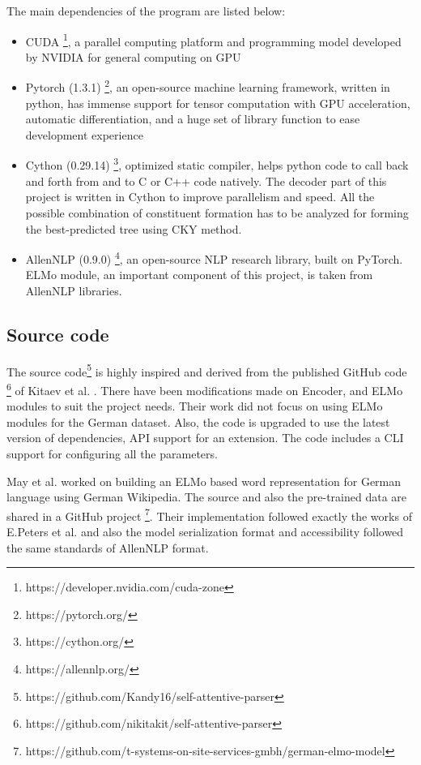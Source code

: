 \documentclass[a4paper, 11pt]{article}
\begin{document}
The main dependencies of the program are listed below:
\begin{itemize}
\item CUDA \footnote{https://developer.nvidia.com/cuda-zone}, a parallel computing platform and programming model developed by NVIDIA for general computing on GPU
\item Pytorch (1.3.1) \footnote{https://pytorch.org/}, an open-source machine learning framework, written in python, has immense support for tensor computation with GPU acceleration, automatic differentiation, and a huge set of library function to ease development experience
\item Cython (0.29.14) \footnote{https://cython.org/}, optimized static compiler, helps python code to call back and forth from and to C or C++ code natively. The decoder part of this project is written in Cython to improve parallelism and speed. All the possible combination of constituent formation has to be analyzed for forming the best-predicted tree using CKY method.
\item AllenNLP (0.9.0) \footnote{https://allennlp.org/}, an open-source NLP research library, built on PyTorch. ELMo module, an important component of this project, is taken from AllenNLP libraries.  
\end{itemize}

\subsection{Source code}

The source code\footnote{https://github.com/Kandy16/self-attentive-parser} is highly inspired and derived from the published GitHub code \footnote{https://github.com/nikitakit/self-attentive-parser} of Kitaev et al. \parencite*{Kitaev2019}. There have been modifications made on Encoder, and ELMo modules to suit the project needs. Their work did not focus on using ELMo modules for the German dataset. Also, the code is upgraded to use the latest version of dependencies, API support for an extension. The code includes a CLI support for configuring all the parameters.


May et al. \parencite*{GerElmo} worked on building an ELMo based word representation for German language using German Wikipedia. The source and also the pre-trained data are shared in a GitHub project \footnote{https://github.com/t-systems-on-site-services-gmbh/german-elmo-model}. Their implementation followed exactly the works of E.Peters et al. \parencite{peters2018deep} and also the model serialization format and accessibility followed the same standards of AllenNLP format.
\end{document}
